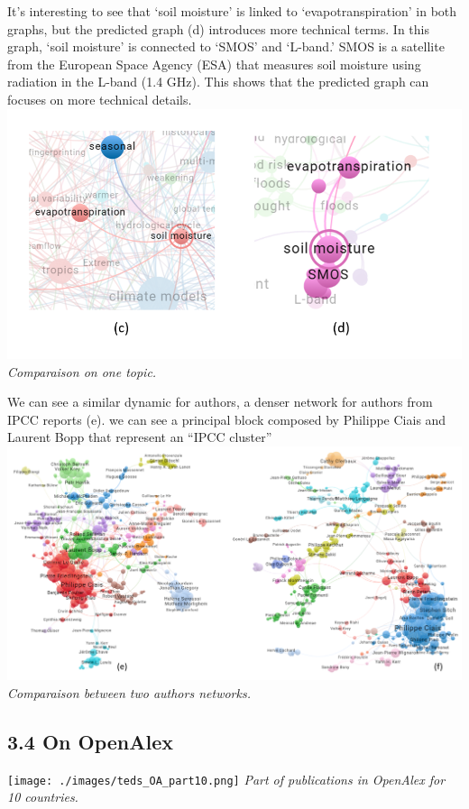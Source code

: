 \documentclass[
]{article}
\begin{document}
It's interesting to see that `soil moisture' is linked to
`evapotranspiration' in both graphs, but the predicted graph (d)
introduces more technical terms. In this graph, `soil moisture' is
connected to `SMOS' and `L-band.' SMOS is a satellite from the European
Space Agency (ESA) that measures soil moisture using radiation in the
L-band (1.4 GHz). This shows that the predicted graph can focuses on
more technical details.
\includegraphics{./images/teds_network_topics2_sensors.png}
\emph{Comparaison on one topic.}

We can see a similar dynamic for authors, a denser network for authors
from IPCC reports (e). we can see a principal block composed by Philippe
Ciais and Laurent Bopp that represent an ``IPCC cluster''\\
\includegraphics{./images/teds_network_authors2.png} \emph{Comparaison
between two authors networks.}

\hypertarget{on-openalex}{%
\subsection{3.4 On OpenAlex}\label{on-openalex}}

\texttt{[image: ./images/teds\_OA\_part10.png]} \emph{Part of publications
in OpenAlex for 10 countries.}
\end{document}
